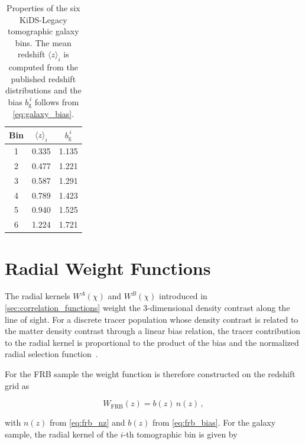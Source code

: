 \begin{table}[H]
    \centering
    \caption{Properties of the six KiDS-Legacy tomographic galaxy bins. The mean redshift
    $\langle z \rangle_i$ is computed from the published redshift distributions and the bias
    $b_{\mathrm{g}}^{\,i}$ follows from \autoref{eq:galaxy_bias}.}
    \label{tab:galaxy_bins}
    \begin{tabular}{
        S[table-format=1]
        @{\hspace{1.2em}}
        S[table-format=1.3]
        @{\hspace{1.0em}}
        S[table-format=1.3]
        }
        \toprule
        Bin & {$\langle z \rangle_i$} & {$b_{\mathrm{g}}^{\,i}$} \\
         & 0.335 & 1.135 \\
        2 & 0.477 & 1.221 \\
        3 & 0.587 & 1.291 \\
        4 & 0.789 & 1.423 \\
        5 & 0.940 & 1.525 \\
        6 & 1.224 & 1.721 \\
        \bottomrule
    \end{tabular}
\end{table}

\section{Radial Weight Functions} \label{sec:weight_functions}
The radial kernels $W^A(\chi)$ and $W^B(\chi)$ introduced in \autoref{sec:correlation_functions} weight the
3-dimensional density contrast along the line of sight. For a discrete tracer population whose 
density contrast is related to the matter density contrast through a linear bias relation, the tracer 
contribution to the radial kernel is proportional to the product of the bias and the normalized radial 
selection function~\cite{Khosravi_2016}.

For the FRB sample the weight function is therefore constructed on the redshift grid as

\begin{equation}\label{eq:weight_frb}
    W_{\mathrm{FRB}}(z) = b(z) \, n(z) \,,
\end{equation}

with $n(z)$ from \autoref{eq:frb_nz} and $b(z)$ from \autoref{eq:frb_bias}. 
For the galaxy sample, the radial kernel of the $i$-th tomographic bin is given by

